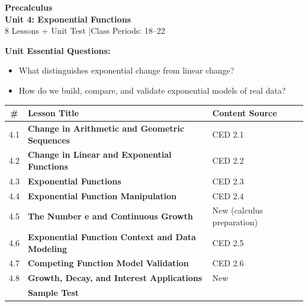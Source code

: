 \documentclass[10pt]{article}
\begin{document}
\thispagestyle{empty}

\vspace{-1.05in}

\begin{center}
  {\color{white}\textbf{\LARGE Precalculus}}\\[6pt]
  {\color{skymid}\Large\textbf{Unit 4: Exponential Functions}}\\[4pt]
  {\color{white}\small 8 Lessons + Unit Test \quad|\quad Class Periods: 18--22}
\end{center}

\vspace{0.26in}

\begin{tcolorbox}[colback=goldbg, colframe=goldacc, boxrule=0.8pt, arc=2mm,
    left=3mm, right=3mm, top=2mm, bottom=2mm]
\small\textbf{Unit Essential Questions:}
\begin{itemize}[leftmargin=1.4em, itemsep=2pt, topsep=2pt]
  \item What distinguishes exponential change from linear change?
  \item How do we build, compare, and validate exponential models of real data?
\end{itemize}
\end{tcolorbox}

\vspace{0.14in}

\begin{tocbox}
\small
\renewcommand{\arraystretch}{1.45}
\begin{tabularx}{\linewidth}{@{} c >{\bfseries}X l @{}}
\rowcolor{sky}
\textbf{\#} & \textbf{Lesson Title} & \textbf{Content Source} \\
\midrule
4.1 & Change in Arithmetic and Geometric Sequences & CED 2.1 \\
4.2 & Change in Linear and Exponential Functions & CED 2.2 \\
4.3 & Exponential Functions & CED 2.3 \\
4.4 & Exponential Function Manipulation & CED 2.4 \\
4.5 & The Number e and Continuous Growth & New (calculus preparation) \\
4.6 & Exponential Function Context and Data Modeling & CED 2.5 \\
4.7 & Competing Function Model Validation & CED 2.6 \\
4.8 & Growth, Decay, and Interest Applications & New \\
\midrule
\rowcolor{sky}
     & \textbf{Sample Test} &      \\
\end{tabularx}
\end{tocbox}
\end{document}
